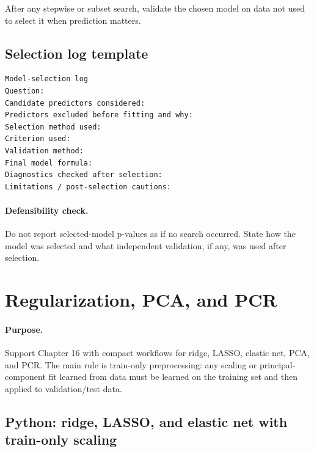 After any stepwise or subset search, validate the chosen model on data not used to select it when prediction matters.

\subsection*{Selection log template}

\begin{verbatim}
Model-selection log
Question:
Candidate predictors considered:
Predictors excluded before fitting and why:
Selection method used:
Criterion used:
Validation method:
Final model formula:
Diagnostics checked after selection:
Limitations / post-selection cautions:
\end{verbatim}

\paragraph{Defensibility check.} Do not report selected-model p-values as if no search occurred.  State how the model was selected and what independent validation, if any, was used after selection.

\section{Regularization, PCA, and PCR}
\label{app:cookbook-regularization-pca-pcr}

\paragraph{Purpose.} Support Chapter 16 with compact workflows for ridge, LASSO, elastic net, PCA, and PCR.  The main rule is train-only preprocessing: any scaling or principal-component fit learned from data must be learned on the training set and then applied to validation/test data.

\subsection*{Python: ridge, LASSO, and elastic net with train-only scaling}

